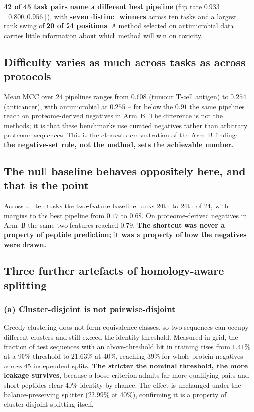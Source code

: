 \documentclass[11pt,a4paper]{article}
\begin{document}
\textbf{42 of 45 task pairs name a different best pipeline} (flip rate $0.933$
$[0.800, 0.956]$), with \textbf{seven distinct winners} across ten tasks and a largest rank
swing of \textbf{20 of 24 positions}. A method selected on antimicrobial data carries
little information about which method will win on toxicity.

\subsection{Difficulty varies as much across tasks as across protocols}

Mean MCC over 24 pipelines ranges from $0.608$ (tumour T-cell antigen) to $0.254$
(anticancer), with antimicrobial at $0.255$ -- far below the $0.91$ the same pipelines
reach on proteome-derived negatives in Arm~B. The difference is not the methods; it is that
these benchmarks use curated negatives rather than arbitrary proteome sequences. This is
the clearest demonstration of the Arm~B finding: \textbf{the negative-set rule, not the
method, sets the achievable number.}

\subsection{The null baseline behaves oppositely here, and that is the point}

Across all ten tasks the two-feature baseline ranks 20th to 24th of 24, with margins to the
best pipeline from $0.17$ to $0.68$. On proteome-derived negatives in Arm~B the same two
features reached $0.79$. \textbf{The shortcut was never a property of peptide prediction;
it was a property of how the negatives were drawn.}

\subsection{Three further artefacts of homology-aware splitting}
\label{sec:artefacts}

\subsubsection*{(a) Cluster-disjoint is not pairwise-disjoint}

Greedy clustering does not form equivalence classes, so two sequences can occupy different
clusters and still exceed the identity threshold. Measured in-grid, the fraction of test
sequences with an above-threshold hit in training rises from $1.41\%$ at a 90\% threshold
to $\mathbf{21.63\%}$ at 40\%, reaching $39\%$ for whole-protein negatives across 45
independent splits. \textbf{The stricter the nominal threshold, the more leakage survives},
because a loose criterion admits far more qualifying pairs and short peptides clear 40\%
identity by chance. The effect is unchanged under the balance-preserving splitter
($22.99\%$ at 40\%), confirming it is a property of cluster-disjoint splitting itself.
\end{document}
